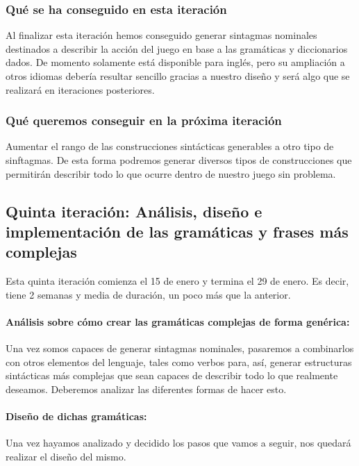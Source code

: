 \subsubsection{Qué se ha conseguido en esta iteración}

Al finalizar esta iteración hemos conseguido generar sintagmas nominales destinados a describir la acción del juego en base a las gramáticas y diccionarios dados. De momento solamente está disponible para inglés, pero su ampliación a otros idiomas debería resultar sencillo gracias a nuestro diseño y será algo que se realizará en iteraciones posteriores.

\subsubsection{Qué queremos conseguir en la próxima iteración}

Aumentar el rango de las construcciones sintácticas generables a otro tipo de sinftagmas. De esta forma podremos generar diversos tipos de construcciones que permitirán describir todo lo que ocurre dentro de nuestro juego sin problema.

\subsection{Quinta iteración: Análisis, diseño e implementación de las gramáticas y frases más complejas}

Esta quinta iteración comienza el 15 de enero y termina el 29 de enero. Es decir, tiene 2 semanas y media de duración, un poco más que la anterior.

\paragraph{Análisis sobre cómo crear las gramáticas complejas de forma genérica:} Una vez somos capaces de generar sintagmas nominales, pasaremos a combinarlos con otros elementos del lenguaje, tales como verbos para, así, generar estructuras sintácticas más complejas que sean capaces de describir todo lo que realmente deseamos. Deberemos analizar las diferentes formas de hacer esto.

\paragraph{Diseño de dichas gramáticas:} Una vez hayamos analizado y decidido los pasos que vamos a seguir, nos quedará realizar el diseño del mismo.

